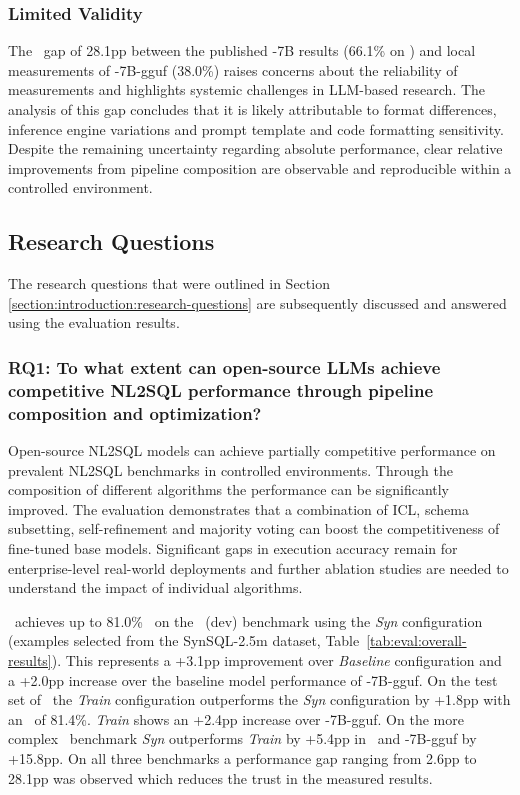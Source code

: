 \subsubsection{Limited Validity}

The \EA~gap of 28.1pp between the published \OmniSQL-7B results (66.1\%
on \Bird) and local measurements of \OmniSQL-7B-gguf (38.0\%) raises concerns
about the reliability of measurements and highlights systemic challenges in
LLM-based research. The analysis of this gap concludes that it is likely
attributable to format differences, inference engine variations and
prompt template and code formatting sensitivity. Despite the remaining
uncertainty regarding absolute performance, clear relative improvements
from pipeline composition are observable and reproducible within a controlled
environment.

\subsection{Research Questions}

The research questions that were outlined in Section
\ref{section:introduction:research-questions} are subsequently discussed and
answered using the evaluation results.

\subsubsection{RQ1: To what extent can open-source LLMs achieve
competitive NL2SQL performance through pipeline composition and optimization?}

Open-source NL2SQL models can achieve partially competitive performance on
prevalent NL2SQL benchmarks in controlled environments. Through the composition
of different algorithms the performance can be significantly improved. The
evaluation demonstrates that a combination of ICL, schema subsetting,
self-refinement and majority voting can boost the competitiveness of fine-tuned
base models. Significant gaps in execution accuracy remain for enterprise-level
real-world deployments and further ablation studies are needed to understand
the impact of individual algorithms.

\Natural~achieves up to 81.0\% \EA~on the \Spider~(dev) benchmark using the
\textit{Syn} configuration (examples selected from the SynSQL-2.5m dataset,
Table~\ref{tab:eval:overall-results}). This represents a +3.1pp
improvement over \textit{Baseline} configuration and a +2.0pp increase over the
baseline model performance of \OmniSQL-7B-gguf. On the test set of \Spider~the
\textit{Train} configuration outperforms the \textit{Syn} configuration by
+1.8pp with an \EA~of 81.4\%. \textit{Train} shows an +2.4pp
increase over \OmniSQL-7B-gguf. On the more complex \Bird~benchmark
\textit{Syn} outperforms \textit{Train} by +5.4pp in \EA~and \OmniSQL-7B-gguf
by +15.8pp. On all three benchmarks a performance gap ranging
from 2.6pp to 28.1pp was observed which reduces the trust in the measured
results.

